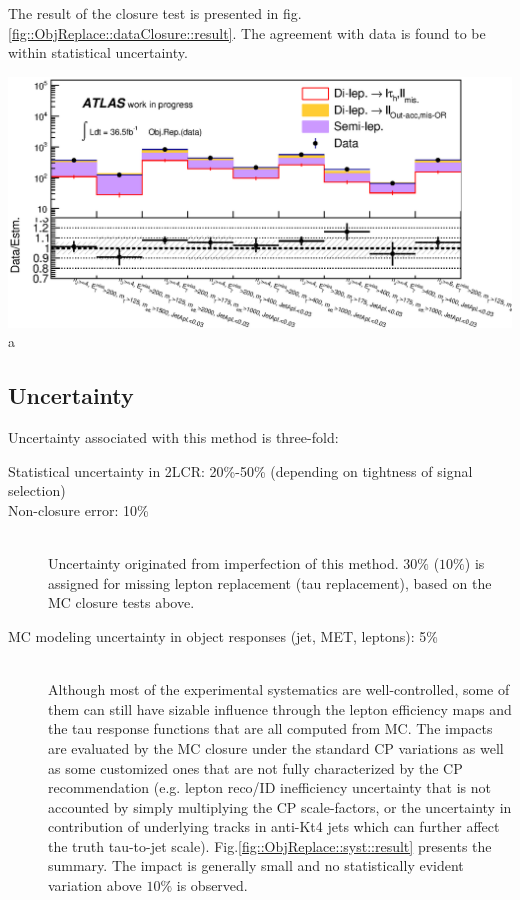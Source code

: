 The result of the closure test is presented in fig.\ref{fig::ObjReplace::dataClosure::result}. The agreement with data is found to be within statistical uncertainty.

\includegraphics[width=180mm]{figures/BGestimation/ObjReplacement/dataClosure/hist_regionYields_myVRsOnly_wide_metTrig0_NoSys_mode0.eps}
\label{fig::ObjReplace::dataClosure::result}a





\clearpage
\subsection{Uncertainty} \label{sec::ObjReplace::syst}
Uncertainty associated with this method is three-fold:
\begin{description}
\item [Statistical uncertainty in 2LCR: 20\%-50\% (depending on tightness of signal selection)]
\item [Non-closure error: 10\%] \mbox{} \\
Uncertainty originated from imperfection of this method. $30\%$ ($10\%$) is assigned for missing lepton replacement (tau replacement), based on the MC closure tests above.
\item [MC modeling uncertainty in object responses (jet, MET, leptons): 5\%] \mbox{} \\
Although most of the experimental systematics are well-controlled, some of them can still have sizable influence through the lepton efficiency maps and the tau response functions that are all computed from MC. The impacts are evaluated by the MC closure under the standard CP variations as well as some customized ones that are not fully characterized by the CP recommendation (e.g. lepton reco/ID inefficiency uncertainty that is not accounted by simply multiplying the CP scale-factors, or the uncertainty in contribution of underlying tracks in anti-Kt4 jets which can further affect the truth tau-to-jet scale). Fig.\ref{fig::ObjReplace::syst::result} presents the summary. The impact is generally small and no statistically evident variation above $10\%$ is observed. 
\end{description}

